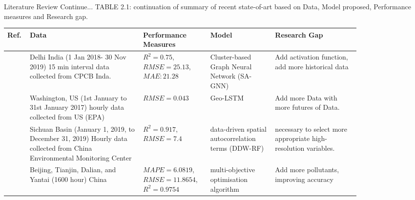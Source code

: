 \documentclass[12pt, aspectratio=169]{beamer}
\begin{document}
\begin{frame}{Literature Review  \tiny{Continue...}}
	\centering
	\scriptsize {TABLE 2.1: continuation of summary of recent state-of-art based on Data,  Model proposed,  Performance measures and Research gap.}\\
	\begin{table}
		\centering
		\begin{tabular}{|p{0.03\linewidth}|p{0.29\linewidth}|p{0.15\linewidth}|p{0.16\linewidth}|p{0.21\linewidth}|}
			\hline
			\footnotesize \textbf {Ref.} & \footnotesize \textbf { Data} & \footnotesize \textbf {Performance Measures } & \footnotesize \textbf {Model} & \footnotesize \textbf {Research Gap }  \\ \hline
			\scriptsize \cite{MANDAL2023137036} \scriptsize & Delhi India (1 Jan 2018- 30 Nov 2019) 15 min interval data collected from CPCB Inda. \scriptsize &$R^2=0.75$,  $RMSE=25.13$,  $MAE: 21.28$ \scriptsize & Cluster-based Graph Neural Network (SA-GNN) \scriptsize & Add activation function, add more historical data \\ \hline
			\scriptsize \cite{MA2019117729} \scriptsize & Washington, US (1st January to 31st January 2017) hourly data collected from US (EPA) \scriptsize & $RMSE = 0.043$ \scriptsize & Geo-LSTM \scriptsize & Add more Data with more futures of Data.  \\ \hline
			\scriptsize \cite{ZHANG2022134890}\scriptsize & Sichuan Basin (January 1,  2019,  to December 31,  2019) Hourly data collected from  China Environmental Monitoring Center  \scriptsize & $R^2= 0.917$, $RMSE=7.4$ \scriptsize & data-driven spatial autocorrelation terms (DDW-RF) \scriptsize & necessary to select more appropriate high-resolution variables. \\ \hline
			\scriptsize \cite{TIAN2022134048} \scriptsize & Beijing,  Tianjin,  Dalian,  and Yantai (1600 hour) China \scriptsize & $MAPE=6.0819$, $RMSE=11.8654$, $R^2=0.9754$ \scriptsize &  multi-objective optimisation algorithm \scriptsize & Add more pollutants, improving accuracy \\ \hline
	\end{tabular}
	\end{table}
\end{frame}
\end{document}
